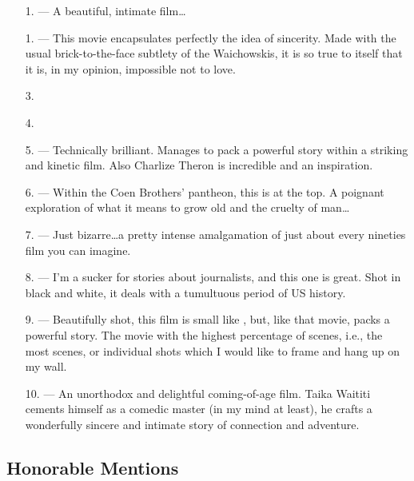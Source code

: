 \documentclass[../butidigress.tex]{subfiles}
\begin{document}
\begin{itemize}
    \item[1.] \textbf{} --- A beautiful, intimate film\ldots{}
    \item[1.] \textbf{} --- This movie encapsulates perfectly the idea of sincerity. Made with the usual brick-to-the-face subtlety of the Waichowskis, it is so true to itself that it is, in my opinion, impossible not to love.
    \item[3.]
    \item[4.] \textbf{}
    \item[5.] \textbf{} --- Technically brilliant. Manages to pack a powerful story within a striking and kinetic film. Also Charlize Theron is incredible and an inspiration.
    \item[6.] \textbf{} --- Within the Coen Brothers' pantheon, this is at the top. A poignant exploration of what it means to grow old and the cruelty of man\ldots
    \item[7.] \textbf{} --- Just bizarre\ldots a pretty intense amalgamation of just about every nineties film you can imagine.
    \item[8.] \textbf{} --- I'm a sucker for stories about journalists, and this one is great. Shot in black and white, it deals with a tumultuous period of US history.
    \item[9.] \textbf{} --- Beautifully shot, this film is small like , but, like that movie, packs a powerful story. The movie with the highest percentage of  scenes, i.e., the most scenes, or individual shots which I would like to frame and hang up on my wall.
    \item[10.] \textbf{} --- An unorthodox and delightful coming-of-age film. Taika Waititi cements himself as a comedic master (in my mind at least), he crafts a wonderfully sincere and intimate story of connection and adventure.
\end{itemize}
\subsection{Honorable Mentions}
\end{document}
